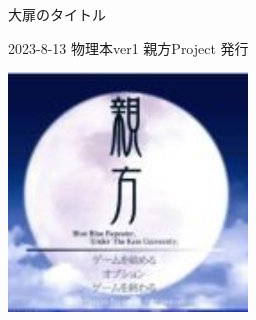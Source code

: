 \clearpage{\thispagestyle{empty}}
\vspace{220pt}

\begin{center}


\begin{sffamily}
\Large
大扉のタイトル
\normalsize
\end{sffamily}
\vspace{320pt}

\begin{sffamily}
2023-8-13
\hspace{5pt}
物理本ver1
\hspace{5pt}
親方Project
\hspace{5pt}
発行
\vspace{10pt}
\end{sffamily}

\includegraphics[width=0.3\linewidth]{images/oyakata.png}

\end{center}
